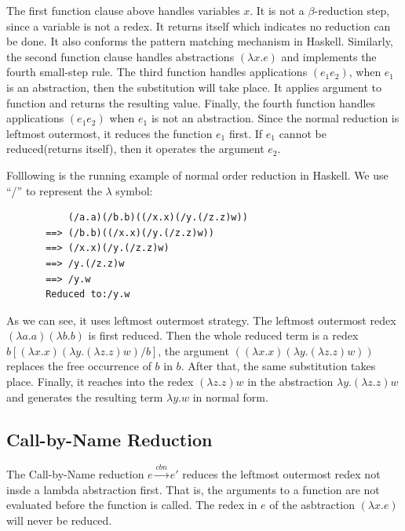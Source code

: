 The first function clause above handles variables $x$. It is not a $\beta$-reduction step, since a variable is not a redex. It returns itself which indicates no reduction can be done. It also conforms the pattern matching mechanism in Haskell. Similarly, the second function clause handles abstractions $(\lambda x.e)$ and implements the fourth small-step rule. The third function handles applications $(e_1e_2)$, when $e_1$ is an abstraction, then the substitution will take place. It applies argument to function and returns the resulting value. Finally, the fourth function handles applications $(e_1e_2)$ when $e_1$ is not an abstraction. Since the normal reduction is leftmost outermost, it reduces the function $e_1$ first. If $e_1$ cannot be reduced(returns itself), then it operates the argument $e_2$. 

\begin{exmp}
\normalfont Folllowing is the running example of normal order reduction in Haskell. We use ``/'' to represent the $\lambda$ symbol:
\end{exmp}

\begin{verbatim}
           (/a.a)(/b.b)((/x.x)(/y.(/z.z)w))
       ==> (/b.b)((/x.x)(/y.(/z.z)w))
       ==> (/x.x)(/y.(/z.z)w)
       ==> /y.(/z.z)w
       ==> /y.w
       Reduced to:/y.w
\end{verbatim}


As we can see, it uses leftmost outermost strategy. The leftmost outermost redex $(\lambda a.a)(\lambda b.b)$ is first reduced. Then the whole reduced term is a redex $b[(\lambda x.x)(\lambda y.(\lambda z.z)w)/b]$, the argument $((\lambda x.x)(\lambda y.(\lambda z.z)w))$ replaces the free occurrence of $b$ in $b$. After that, the same substitution takes place. Finally, it reaches into the redex $(\lambda z.z)w$ in the abstraction $\lambda y.(\lambda z.z)w$ and generates the resulting term $\lambda y.w$ in normal form.


\subsection{Call-by-Name Reduction}{\label{subsec:cbn}}

The Call-by-Name reduction $e\xrightarrow{cbn} e'$ reduces the leftmost outermost redex not insde a lambda abstraction first. That is, the arguments to a function are not evaluated before the function is called. The redex in $e$ of the asbtraction $(\lambda x.e)$ will never be reduced. 


